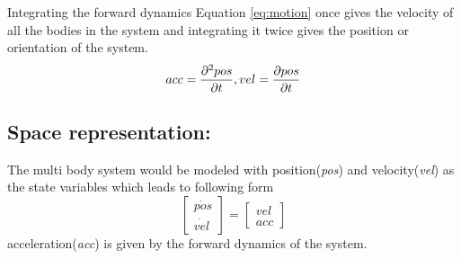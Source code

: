 Integrating the forward dynamics Equation \ref{eq:motion} once gives the velocity of all the bodies in the system and integrating it twice gives the position or orientation of the system. $$ acc = \frac{\partial {^2pos}}{\partial {t}}, vel = \frac{\partial {pos}}{\partial {t}} $$ 
\subsection{Space representation:}
The multi body system would be modeled with position(\emph{pos}) and velocity(\emph{vel}) as the state variables which leads to following form 
\begin{equation}
\label{eq:newton_motion}
 \begin{bmatrix}
\dot{pos} \\ \dot{vel}
\end{bmatrix}
= \begin{bmatrix}
vel \\ acc
\end{bmatrix}
\end{equation}
acceleration(\emph{acc}) is given by the forward dynamics of the system.

